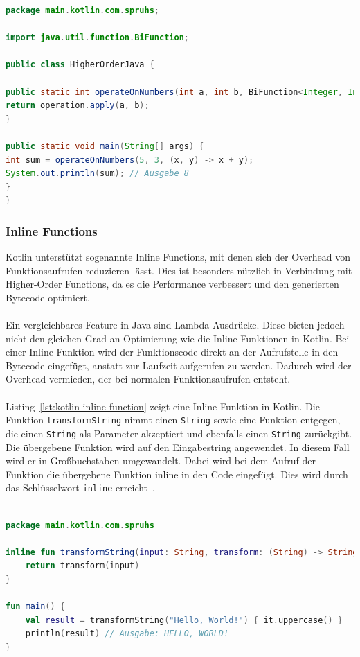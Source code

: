 \documentclass[11pt]{article}
\begin{document}
    \begin{lstlisting}[language=Java, caption={HigherOrderJava.java}, label={lst:java-higher-order-function}]
package main.kotlin.com.spruhs;

import java.util.function.BiFunction;

public class HigherOrderJava {

public static int operateOnNumbers(int a, int b, BiFunction<Integer, Integer, Integer> operation) {
return operation.apply(a, b);
}

public static void main(String[] args) {
int sum = operateOnNumbers(5, 3, (x, y) -> x + y);
System.out.println(sum); // Ausgabe 8
}
}
    \end{lstlisting}

    \subsubsection{Inline Functions}
    Kotlin unterstützt sogenannte Inline Functions, mit denen sich der Overhead von Funktionsaufrufen reduzieren lässt.
    Dies ist besonders nützlich in Verbindung mit Higher-Order Functions, da es die Performance verbessert und den generierten Bytecode optimiert.\\
    \\
    Ein vergleichbares Feature in Java sind Lambda-Ausdrücke.
    Diese bieten jedoch nicht den gleichen Grad an Optimierung wie die Inline-Funktionen in Kotlin.
    Bei einer Inline-Funktion wird der Funktionscode direkt an der Aufrufstelle in den Bytecode eingefügt, anstatt zur Laufzeit aufgerufen zu werden.
    Dadurch wird der Overhead vermieden, der bei normalen Funktionsaufrufen entsteht.\\
    \\
    Listing~\ref{lst:kotlin-inline-function} zeigt eine Inline-Funktion in Kotlin.
    Die Funktion \texttt{transformString} nimmt einen \texttt{String} sowie eine Funktion entgegen, die einen \texttt{String} als Parameter akzeptiert und ebenfalls einen \texttt{String} zurückgibt.
    Die übergebene Funktion wird auf den Eingabestring angewendet.
    In diesem Fall wird er in Großbuchstaben umgewandelt.
    Dabei wird bei dem Aufruf der Funktion die übergebene Funktion inline in den Code eingefügt.
    Dies wird durch das Schlüsselwort \texttt{inline} erreicht~\cite{kotlin-inline}.\\
    \\

    \begin{lstlisting}[language=Kotlin, caption={InlineFunction.java}, label={lst:kotlin-inline-function}]
package main.kotlin.com.spruhs

inline fun transformString(input: String, transform: (String) -> String): String {
    return transform(input)
}

fun main() {
    val result = transformString("Hello, World!") { it.uppercase() }
    println(result) // Ausgabe: HELLO, WORLD!
}
    \end{lstlisting}
\end{document}
